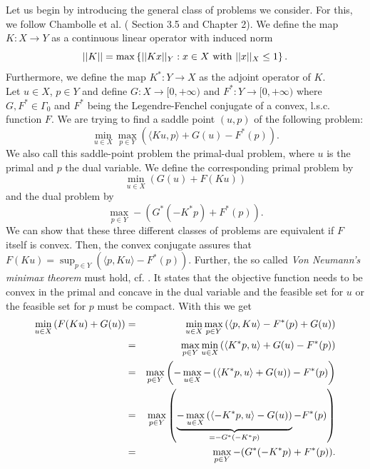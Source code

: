\documentclass[abstracton]{scrreprt}
\begin{document}
        Let us begin by introducing the general class of problems we consider. For this, we follow Chambolle et al. (\cite{Chambolle-et-al-10} Section 3.5 and \cite{Chambolle10afirst-order} Chapter 2). We define the map $K: X \longrightarrow Y$ as a continuous linear operator with induced norm
            $$
                ||K|| = \max \left\{ ||Kx||_{Y} : x \in X \,\, \textnormal{with} \,\, ||x||_{X} \le 1 \right\}.
            $$
        Furthermore, we define the map $K^{\ast}: Y \longrightarrow X$ as the adjoint operator of $K$.\\
        Let $u \in X$, $p \in Y$ and define $G: X \longrightarrow [0, +\infty)$ and $F^{\ast}: Y \longrightarrow [0, +\infty)$ where $G, F^{\ast} \in \Gamma_{0}$ and $F^{\ast}$ being the Legendre-Fenchel conjugate of a convex, l.s.c. function $F$. We are trying to find a saddle point $(u, p)$ of the following problem:
            \begin{equation}
                \min_{u \in X} \max_{p \in Y} \left( \langle Ku, p \rangle + G(u) - F^{\ast}(p) \right).
                \label{eq:the_saddle_point_problem}
            \end{equation}
        We also call this saddle-point problem the primal-dual problem, where $u$ is the primal and $p$ the dual variable. We define the corresponding primal problem by
            \begin{equation}
                \min_{u \in X} \left( G(u) + F(Ku) \right)
                \label{eq:primal_problem}
            \end{equation}
        and the dual problem by
            \begin{equation}
                \max_{p \in Y} -(G^{\ast}(-K^{\ast}p) + F^{\ast}(p)).
                \label{eq:dual_problem}
            \end{equation}
        We can show that these three different classes of problems are equivalent if $F$ itself is convex. Then, the convex conjugate assures that $F(Ku) = \sup_{p \in Y} \left( \langle p, Ku \rangle - F^{\ast}(p) \right)$. Further, the so called \textit{Von Neumann's minimax theorem} must hold, cf. \cite{Zeidler}. It states that the objective function needs to be convex in the primal and concave in the dual variable and the feasible set for $u$ or the feasible set for $p$ must be compact. With this we get
            \begin{eqnarray}
                \min_{u \in X} \left(F(Ku) + G(u)\right) &=& \min_{u \in X} \max_{p \in Y} \left(\langle p, Ku \rangle - F^{\ast}(p) + G(u) \right) \notag \\
                &=& \max_{p \in Y} \min_{u \in X} \left(\langle K^{\ast}p, u \rangle + G(u) - F^{\ast}(p) \right) \notag \\
                &=& \max_{p \in Y} \left( -\max_{u \in X} -\left( \langle K^{\ast}p, u \rangle + G(u) \right) - F^{\ast}(p) \right) \notag \\
                &=& \max_{p \in Y} \left( \underbrace{-\max_{u \in X} \left( \langle -K^{\ast}p, u \rangle - G(u) \right)}_{= -G^{\ast}(-K^{\ast}p)} - F^{\ast}(p) \right) \notag \\
                &=& \max_{p \in Y} -(G^{\ast}(-K^{\ast}p) + F^{\ast}(p)). \notag
            \end{eqnarray}
\end{document}
